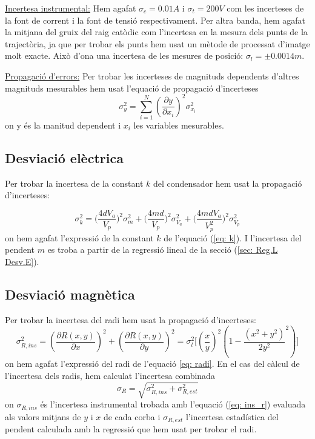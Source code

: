 \documentclass[11pt]{article}
\begin{document}
\underline{Incertesa instrumental:} Hem agafat $\sigma_{c}=0.01A$ i $\sigma_{t}=200V$ com les incerteses de la font de corrent i la font de tensió respectivament. Per altra banda, hem agafat la mitjana del gruix del raig catòdic com  l'incertesa en la mesura dels punts de la trajectòria, ja que per trobar els punts hem usat un mètode de processat d'imatge molt exacte. Això d'ona una incertesa de les mesures de posició: $\sigma_{l}=\pm0.0014m$.

\underline{Propagació d'errors:} Per trobar les incerteses de magnituds dependents d'altres magnituds mesurables hem usat l'equació de propagació d'incerteses
\begin{equation}
    \sigma_{y}^2=\sum_{i=1}^{N}(\frac{\partial y}{\partial x_i})^2\sigma_{x_i}^2
\end{equation}
on y és la manitud dependent i ${x_i}$ les variables mesurables.
\subsection{Desviació elèctrica} \label{subsec: Inc. Desv. Elect.}
Per trobar la incertesa de la constant $k$ del condensador hem usat la propagació d'incerteses:

 \begin{equation}
     \sigma^2_k=\bigg(\frac{4dV_a}{V_p}\bigg)^2\sigma_m^2 + \bigg(\frac{4md}{V_p}\bigg)^2\sigma_{V_a}^2+\bigg(\frac{4mdV_a}{V_p^2}\bigg)^2\sigma_{V_p}^2
 \end{equation}
 on hem agafat l'expressió de la constant $k$ de l'equació (\ref{eq: k}). I l'incertesa del pendent $m$ es troba a partir de la regressió lineal de la secció (\ref{sec: Reg.L Desv.E}).

\subsection{Desviació magnètica}
Per trobar la incertesa del radi hem usat la propagació d'incerteses:
\begin{equation}
    \sigma_{R,ins}^2 = (\frac{\partial R(x,y)}{\partial x})^2 +(\frac{\partial R(x,y)}{\partial y})^2= \sigma_{l}^2\bigg[(\frac{x}{y})^2(1-\frac{(x^2+y^2)}{2y^2}^2)\bigg]
    \label{eq: ins_r}
\end{equation}
on hem agafat l'expressió del radi de l'equació \ref{eq: radi}.
En el cas del càlcul de l'incertesa dels radis, hem calculat l'incertesa combinada 
\begin{equation}
    \sigma_{R}=\sqrt{\sigma_{R,ins}^2+\sigma_{R,est}^2}
\end{equation}
on $\sigma_{R,ins}$ és l'incertesa instrumental trobada amb l'equació (\ref{eq: ins_r}) evaluada als valors mitjans de $y$ i $x$ de cada corba i $\sigma_{R,est}$ l'incertesa estadística del pendent calculada amb la regressió que hem usat per trobar el radi.
\end{document}
